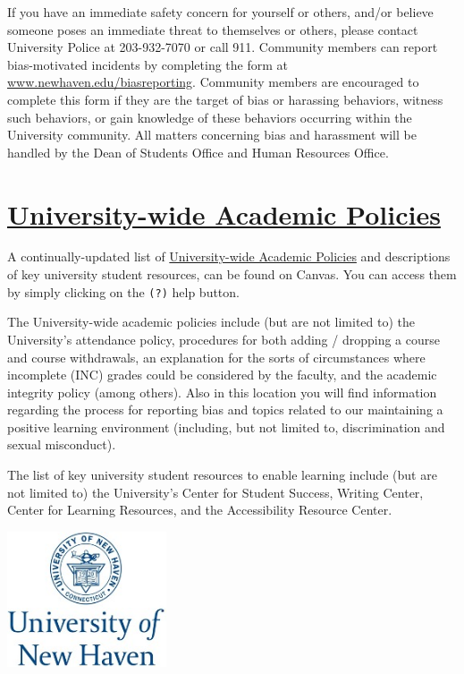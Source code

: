 \documentclass[11pt,]{article}
\begin{document}
If you have an immediate safety concern for yourself or others, and/or
believe someone poses an immediate threat to themselves or others,
please contact University Police at 203-932-7070 or call 911. Community
members can report bias-motivated incidents by completing the form at
\url{www.newhaven.edu/biasreporting}. Community members are encouraged
to complete this form if they are the target of bias or harassing
behaviors, witness such behaviors, or gain knowledge of these behaviors
occurring within the University community. All matters concerning bias
and harassment will be handled by the Dean of Students Office and Human
Resources Office.

\hypertarget{university-wide-academic-policies}{%
\section{\texorpdfstring{\href{https://unh-web-01.newhaven.edu//mycharger/AcademicPoliciesinSyllabi.pdf}{University-wide
Academic
Policies}}{University-wide Academic Policies}}\label{university-wide-academic-policies}}

A continually-updated list of
\href{https://unh-web-01.newhaven.edu//mycharger/AcademicPoliciesinSyllabi.pdf}{University-wide
Academic Policies} and descriptions of key university student resources,
can be found on Canvas. You can access them by simply clicking on the
\texttt{(?)} help button.

The University-wide academic policies include (but are not limited to)
the University's attendance policy, procedures for both adding /
dropping a course and course withdrawals, an explanation for the sorts
of circumstances where incomplete (INC) grades could be considered by
the faculty, and the academic integrity policy (among others). Also in
this location you will find information regarding the process for
reporting bias and topics related to our maintaining a positive learning
environment (including, but not limited to, discrimination and sexual
misconduct).

The list of key university student resources to enable learning include
(but are not limited to) the University's Center for Student Success,
Writing Center, Center for Learning Resources, and the Accessibility
Resource Center.

\newpage

\begin{center} 
\includegraphics[height=4cm]{images/logo6.jpg}
\end{center}
\end{document}

